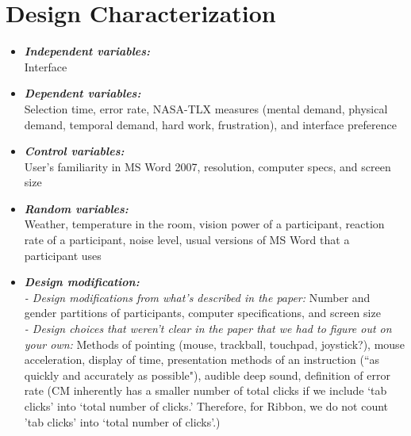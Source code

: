 \documentclass{article}
\begin{document}
\section*{Design Characterization}  
\begin{itemize}
   \item \textbf{\textit{Independent variables:}} \\
   Interface 
    \item \textbf{\textit{Dependent variables:}}\\
    Selection time, error rate, NASA-TLX measures (mental demand, physical demand, temporal demand, hard work, frustration), and interface preference 
    \item \textbf{\textit{Control variables:}} \\
   User's familiarity in MS Word 2007, resolution, computer specs, and screen size
   \item \textbf{\textit{Random variables:}} \\
   Weather, temperature in the room, vision power of a participant, reaction rate of a participant, noise level, usual versions of MS Word that a participant uses
   \item \textbf{\textit{Design modification:}} \\
   \textit{- Design modifications from what's described in the paper:}
   Number and gender partitions of participants, computer specifications, and screen size
   \\
   \textit{- Design choices that weren't clear in the paper that we had to figure out on your own:}
   Methods of pointing (mouse, trackball, touchpad, joystick?), mouse acceleration, display of time, presentation methods of an instruction (``as quickly and accurately as possible"), audible deep sound, definition of error rate (CM inherently has a smaller number of total clicks if we include `tab clicks' into `total number of clicks.' Therefore, for Ribbon, we do not count 'tab clicks' into `total number of clicks'.) 
   \end{itemize}
\end{document}
